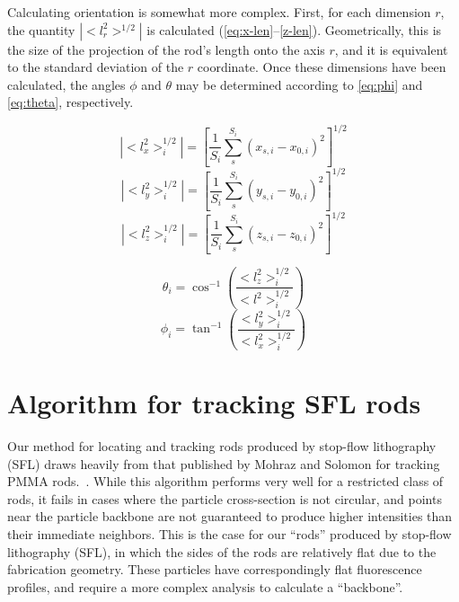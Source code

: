 Calculating orientation is somewhat more complex.  First, for each dimension $r$, the quantity
$|<l_r^2>^{1/2}|$ is calculated (\ref{eq:x-len}--\ref{z-len}). 
Geometrically, this is the size of the projection of the rod's length
onto the axis $r$, and it is equivalent to the standard deviation of the $r$ coordinate.
Once these dimensions have been calculated, the angles $\phi$ and $\theta$ may be 
determined according to \ref{eq:phi} and \ref{eq:theta}, respectively.

\begin{equation}
\label{eq:x-len}
|<l_x^2>_i^{1/2}| = \left[\frac{1}{S_i} \sum_s^{S_i} (x_{s,i} - x_{0,i} )^2 \right]^{1/2}
\end{equation}
\begin{equation}
\label{eq:y-len}
|<l_y^2>_i^{1/2}| = \left[\frac{1}{S_i} \sum_s^{S_i} (y_{s,i} - y_{0,i} )^2 \right]^{1/2}
\end{equation}
\begin{equation}
\label{eq:z-len}
|<l_z^2>_i^{1/2}| = \left[\frac{1}{S_i} \sum_s^{S_i} (z_{s,i} - z_{0,i} )^2 \right]^{1/2}
\end{equation}

\begin{equation}
\label{eq:theta}
\theta_i = \cos^{-1} \left(\frac{<l_z^2>_i^{1/2}}{<l^2>_i^{1/2}} \right)
\end{equation}
\begin{equation}
\label{eq:phi}
\phi_i = \tan^{-1} \left(\frac{<l_y^2>_i^{1/2}}{<l_x^2>_i^{1/2}} \right)
\end{equation}

\section{Algorithm for tracking SFL rods}
\label{sec:rod-tracking}

Our method for locating and tracking rods produced by stop-flow lithography (SFL) draws heavily from that published by 
Mohraz and Solomon for tracking PMMA rods.~\cite{rods-mohraz}.
While this algorithm performs very well for a restricted class of rods, it fails in cases where the particle
cross-section is not circular, and points near the particle backbone are not guaranteed to produce higher 
intensities than their immediate neighbors.  This is the case for our ``rods'' produced by stop-flow
lithography (SFL), in which the sides of the rods are relatively flat due to the fabrication
geometry. These particles have correspondingly flat fluorescence profiles, and require a more complex analysis
to calculate a ``backbone''.

